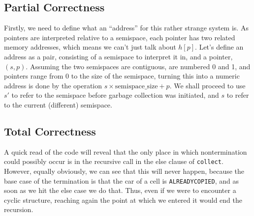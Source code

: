 \subsection{Partial Correctness}
\label{sec:copying-example-partial}


Firstly, we need to define what an ``address'' for this rather strange
system is. As pointers are interpreted relative to a semispace, each
pointer has two related memory addresses, which means we can't just
talk about $h[p]$. Let's define an address as a pair, consisting of a
semispace to interpret it in, and a pointer, $(s, p)$. Assuming the
two semispaces are contiguous, are numbered 0 and 1, and pointers
range from 0 to the size of the semispace, turning this into a numeric
address is done by the operation $s \times \mathrm{semispace\_size} +
p$. We shall proceed to use $s'$ to refer to the semispace before
garbage collection was initiated, and $s$ to refer to the current
(different) semispace.

\subsection{Total Correctness}
\label{sec:copying-example-total}

A quick read of the code will reveal that the only place in which
nontermination could possibly occur is in the recursive call in the
else clause of \texttt{collect}. However, equally obviously, we can
see that this will never happen, because the base case of the
termination is that the car of a cell is \texttt{ALREADYCOPIED}, and
as soon as we hit the else case we do that. Thus, even if we were to
encounter a cyclic structure, reaching again the point at which we
entered it would end the recursion.

